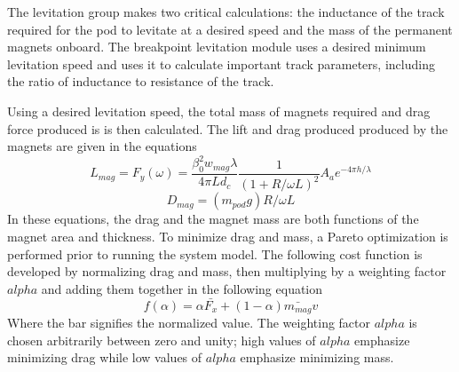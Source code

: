 	The levitation group makes two critical calculations: the inductance of the
	track required for the pod to levitate at a desired speed and the mass of
	the permanent magnets onboard. The breakpoint levitation module uses a
	desired minimum levitation speed and uses it to calculate important track
	parameters, including the ratio of inductance to resistance of the track.

	Using a desired levitation speed, the total mass of magnets required and
	drag force produced is is then calculated. The lift and drag produced
	produced by the magnets are given in the equations
	\begin{equation}
		\label{eq:fy_lev}
		L_{mag} = F_{y}(\omega)=\frac{\beta _{0}^{2}w_{mag}\lambda}{4\pi Ld_{c}}\frac{1}{(1+R/\omega L)^{2}}A_ae^{-4\pi h/\lambda }
	\end{equation}
	\begin{equation}
		\label{eq:dmag}
		D_{mag}=( m_{pod}g)R/\omega L
	\end{equation}
	In these equations, the drag and the magnet mass are both functions of the
	magnet area and thickness. To minimize drag and mass, a Pareto optimization
	is performed prior to running the system model. The following cost function
	is developed by normalizing drag and mass, then multiplying by a weighting
	factor $alpha$ and adding them together in the following equation
	\begin{equation}
		\label{eq:pareto}
		f(\alpha ) = \alpha \bar{F_{x}} + (1-\alpha )\bar{m_{mag}}v
	\end{equation}
	Where the bar signifies the normalized value. The weighting factor $alpha$
	is chosen arbitrarily between zero and unity; high values of $alpha$
	emphasize minimizing drag while low values of $alpha$ emphasize minimizing mass.




